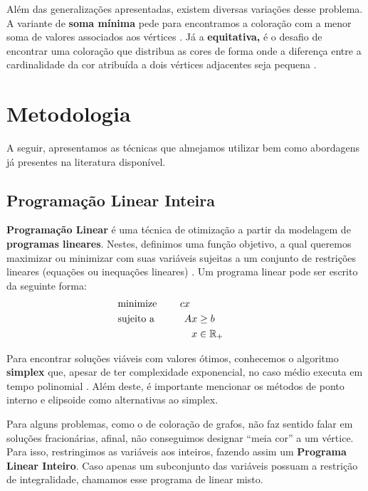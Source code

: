 \documentclass[11pt]{article}
\begin{document}
Além das generalizações apresentadas, existem diversas variações desse problema.
A variante de \textbf{soma mínima} pede para encontramos a coloração com a menor soma de valores associados aos vértices \autocite{Jin2016Algorithmsminimumsum}.
Já a \textbf{equitativa,} é o desafio de encontrar uma coloração que distribua as cores de forma onde a diferença entre a cardinalidade da cor atribuída a dois vértices adjacentes seja pequena \autocite{Meyer1973EquitableColoring}.

\section{Metodologia}
\label{sec:orgaa1400b}
\label{metodologia}
A seguir, apresentamos as técnicas que almejamos utilizar bem como abordagens já presentes na literatura disponível.

\subsection{Programação Linear Inteira}
\label{sec:org11b7708}
\textbf{Programação Linear} é uma técnica de otimização a partir da modelagem de \textbf{programas lineares}.
Nestes, definimos uma função objetivo, a qual queremos maximizar ou minimizar com suas variáveis sujeitas a um conjunto de restrições lineares (equações ou inequações lineares) \autocite{Chvatal1983LinearProgramming} . Um programa linear pode ser escrito da seguinte forma:
\begin{alignat*}{4}
& \omit\rlap{minimize \quad \quad $\displaystyle cx$} \\
& \mbox{sujeito a}&& \quad & Ax & \geq b  & \quad &  \\
&                 &&       & x               & \in \mathbb{R}_+ &      &
\end{alignat*}

Para encontrar soluções viáveis com valores ótimos, conhecemos o algoritmo \textbf{simplex} que, apesar de ter complexidade exponencial, no caso médio executa em tempo polinomial \autocite{Borgwardt1986SimplexMethodAlgorithms}.
Além deste, é importante mencionar os métodos de ponto interno \autocite{Karmarkar1984newpolynomialtime} e elipsoide \autocite{Bland1981FeatureArticleTheEllipsoid} como alternativas ao simplex.

Para alguns problemas, como o de coloração de grafos, não faz sentido falar em soluções fracionárias, afinal, não conseguimos designar ``meia cor'' a um vértice.
Para isso, restringimos as variáveis aos inteiros, fazendo assim um \textbf{Programa Linear Inteiro}. Caso apenas um subconjunto das variáveis possuam a restrição de integralidade, chamamos esse programa de linear misto.
\end{document}
